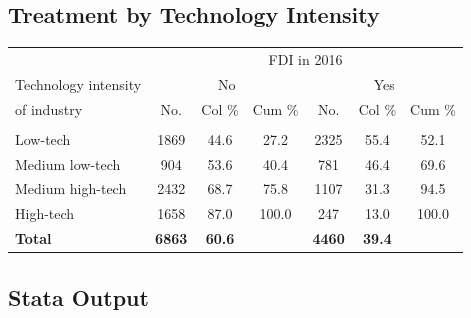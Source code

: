 \documentclass[a4paper,11pt]{scrartcl}
\begin{document}
\subsection{Treatment by Technology Intensity}
\label{app:tech}
\begin{table}[htbp]
	\centering
\begin{threeparttable}

\begin{tabular}{lcccccc} 
\hline
\hline
 & \multicolumn{6}{c}{FDI in 2016} \\
Technology intensity & \multicolumn{3}{c}{No} & \multicolumn{3}{c}{Yes} \\
of industry &No.&Col \% &Cum \% &No.&Col \% &Cum \% \\
\hline
	&  &  &  &  &  &   \\
Low-tech &1869&44.6&27.2&2325&55.4&52.1 \\
Medium low-tech &904&53.6&40.4&781&46.4&69.6 \\
Medium high-tech &2432&68.7&75.8&1107&31.3&94.5 \\
High-tech &1658&87.0&100.0&247&13.0&100.0 \\
\textbf{Total}&\textbf{6863}&\textbf{60.6}&&\textbf{4460}&\textbf{39.4}& \\
\hline
\hline
\end{tabular}

\end{threeparttable}
\end{table}

\subsection{Stata Output}
\label{app:logfile}
\end{document}
